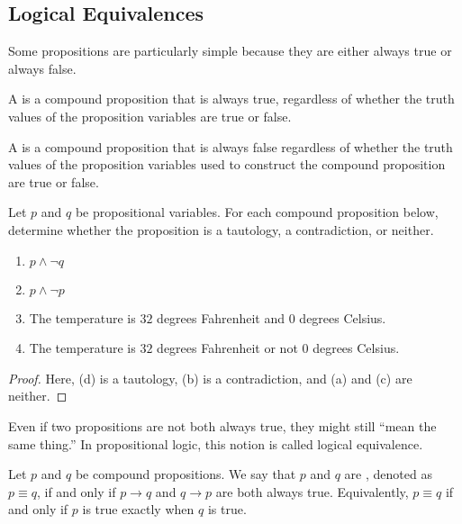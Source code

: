\documentclass[../notes.tex]{subfiles}
\begin{document}
\subsection{Logical Equivalences}
Some propositions are particularly simple because they are either always true or always false.
\begin{definition}[tautology]
    A  is a compound proposition that is always true, regardless of whether the truth values of the proposition variables are true or false. 
\end{definition}
\begin{definition}[contradiction]
    A  is a compound proposition that is always false regardless of whether the truth values of the proposition variables used to construct the compound proposition are true or false.
\end{definition}
\begin{example}
    Let $p$ and $q$ be propositional variables. For each compound proposition below, determine whether the proposition is a tautology, a contradiction, or neither. 
    \begin{enumerate}[label=(\alph*)]
        \item $p \land \neg q$
        \item $p \land \neg p$
        \item The temperature is $32$ degrees Fahrenheit and $0$ degrees Celsius.
        \item The temperature is $32$ degrees Fahrenheit or not $0$ degrees Celsius.
    \end{enumerate}
\end{example}
\begin{proof}
    Here, (d) is a tautology, (b) is a contradiction, and (a) and (c) are neither.
\end{proof}
Even if two propositions are not both always true, they might still ``mean the same thing.'' In propositional logic, this notion is called logical equivalence.
\begin{definition}
    Let $p$ and $q$ be compound propositions. We say that $p$ and $q$ are , denoted as $p \equiv q$, if and only if $p \rightarrow q$ and $q \rightarrow p$ are both always true. Equivalently, $p\equiv q$ if and only if $p$ is true exactly when $q$ is true.
\end{definition}
\end{document}
